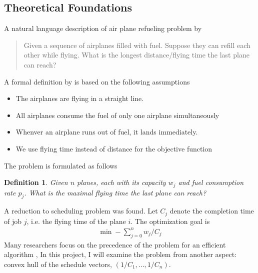 \documentclass[12pt,letterpaper]{article}
\newtheorem{definition}[theorem]{Definition}
\begin{document}
\subsection{Theoretical Foundations}
A natural language description of air plane refueling problem by \cite{puzzle}
\begin{quotation}
    Given a sequence of airplanes filled with fuel. Suppose they can refill each other while flying.
    What is the longest distance/flying time the last plane can reach?
\end{quotation}
A formal definition by \cite{woeginger2010scheduling} is based on the following assumptions
\begin{itemize}
    \item The airplanes are flying in a straight line.
    \item All airplanes consume the fuel of only one airplane simultaneously
    \item Whenver an airplane runs out of fuel, it lands immediately.
    \item We use flying time instead of distance for the objective function
\end{itemize}
The problem is formulated as follows
\begin{definition}
    Given $n$ planes, each with its capacity $w_j$ and fuel consumption rate $p_j$. What is the maximal flying time the last plane can reach?
\end{definition}
A reduction to scheduling problem was found. Let $C_j$ denote the completion time of job $j$, i.e. the flying time of the plane $i$.
The optimization goal is 
\begin{align*}
    \min -\sum_{j=0}^n w_j / C_j
\end{align*}
Many researchers focus on the precedence of the problem for an efficient algorithm \cite{li2019fast} \cite{vasquez2015airplane},
In this project, I will examine the problem from another aspect: convex hull of the schedule vectors, $(1/C_1, ..., 1/C_n)$.
\end{document}
